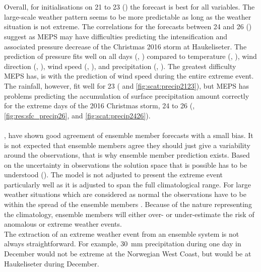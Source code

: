 \noindent
\\
\\
Overall, for initialisations on \num{21} to \SI{23}{\dec} () the forecast is best for all variables. 
The large-scale weather pattern seems to be more predictable as long as the weather situation is not extreme.
The correlations for the forecasts between \num{24} and \SI{26}{\dec} () suggest as MEPS may have difficulties predicting the intensification and associated pressure decrease of the Christmas 2016 storm at Haukeliseter. The prediction of pressure fits well on all days (, ) compared to temperature (, ), wind direction (, ), wind speed (, ), and precipitation (, ). The greatest difficulty MEPS has, is with the prediction of wind speed during the entire extreme event. The rainfall, however, fit well for \SI{23}{\dec} ( and \ref{fig:scat:precip2123}), but MEPS has problems predicting the accumulation of surface precipitation amount correctly for the extreme days of the 2016 Christmas storm, \num{24} to \SI{26}{\dec} (, \ref{fig:res:sfc_precip26}, and \ref{fig:scat:precip2426}).
\\
\\
,  have shown good agreement of ensemble member forecasts with a small bias. It is not expected that ensemble members agree they should just give a variability around the observations, that is why ensemble member prediction exists. Based on the uncertainty in observations the solution space that is possible has to be understood (). The model is not adjusted to present the extreme event particularly well as it is adjusted to span the full climatological range. For large weather situations which are considered as normal the observations have to be within the spread of the ensemble members \citep{owens_ecmwf_2018}. Because of the nature representing the climatology, ensemble members will either over- or under-estimate the risk of anomalous or extreme weather events.
\\
The extraction of an extreme weather event from an ensemble system is not always straightforward. For example, \SI{30}{\mm} precipitation during one day in December would not be extreme at the Norwegian West Coast, but would be at Haukeliseter during December.





